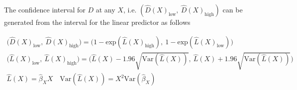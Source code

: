 The confidence interval for $D$ at any $X$, i.e. $(\hat{D}(X)_{\text{low}},~\hat{D}(X)_{\text{high}})$ can be generated from the interval for the linear predictor as follows

\begin{gather*}
    \big(\hat{D}(X)_{\text{low}},~\hat{D}(X)_{\text{high}}\big)  =
    \big(
    1 - \text{exp}(\hat{L}(X)_{\text{high}}),~
    1 - \text{exp}(\hat{L}(X)_{\text{low}})
    \big)                                                       \\
    \big(\hat{L}(X)_{\text{low}},~\hat{L}(X)_{\text{high}}\big)  =
    \big(
    \hat{L}(X) - 1.96 \sqrt{\text{Var}(\hat{L}(X))},~
    \hat{L}(X) + 1.96 \sqrt{\text{Var}(\hat{L}(X))}
    \big)                                                       \\
    \hat{L}(X) = \hat{\beta}_XX \quad
    \text{Var}(\hat{L}(X)) = X^2\text{Var}(\hat{\beta}_X)
\end{gather*}
